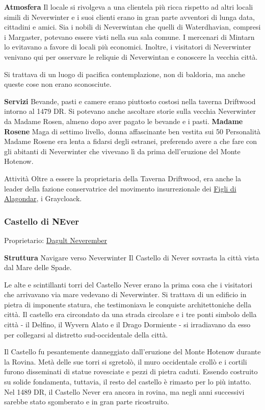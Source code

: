 \documentclass{article}
\begin{document}
\textbf{Atmosfera}
Il locale si rivolgeva a una clientela più ricca rispetto ad altri locali simili di Neverwinter e i suoi clienti erano in gran parte avventori di lunga data, cittadini e amici. Sia i nobili di Neverwintan che quelli di Waterdhavian, compresi i Margaster, potevano essere visti nella sua sala comune. I mercenari di Mintarn lo evitavano a favore di locali più economici. Inoltre, i visitatori di Neverwinter venivano qui per osservare le reliquie di Neverwintan e conoscere la vecchia città.

Si trattava di un luogo di pacifica contemplazione, non di baldoria, ma anche queste cose non erano sconosciute.

\textbf{Servizi}
Bevande, pasti e camere erano piuttosto costosi nella taverna Driftwood intorno al 1479 DR. Si potevano anche ascoltare storie sulla vecchia Neverwinter da Madame Rosen, almeno dopo aver pagato le bevande e i pasti.\newline
\textbf{Madame Rosene} Maga di settimo livello, donna affascinante ben vestita sui 50
Personalità
Madame Rosene era lenta a fidarsi degli estranei, preferendo avere a che fare con gli abitanti di Neverwinter che vivevano lì da prima dell'eruzione del Monte Hotenow.

Attività
Oltre a essere la proprietaria della Taverna Driftwood, era anche la leader della fazione conservatrice del movimento insurrezionale dei \hyperlink{alagondar}{Figli di Alagondar}, i Graycloack.

              \subsubsection{Castello di NEver}
Proprietario: \href{https://forgottenrealms.fandom.com/wiki/Dagult_Neverember}{Dagult Neverember}

\textbf{Struttura}
Navigare verso Neverwinter
Il Castello di Never sovrasta la città vista dal Mare delle Spade.

Le alte e scintillanti torri del Castello Never erano la prima cosa che i visitatori che arrivavano via mare vedevano di Neverwinter. Si trattava di un edificio in pietra di imponente statura, che testimoniava le conquiste architettoniche della città. Il castello era circondato da una strada circolare e i tre ponti simbolo della città - il Delfino, il Wyvern Alato e il Drago Dormiente - si irradiavano da esso per collegarsi al distretto sud-occidentale della città.

Il Castello fu pesantemente danneggiato dall'eruzione del Monte Hotenow durante la Rovina. Metà delle sue torri si sgretolò, il muro occidentale crollò e i cortili furono disseminati di statue rovesciate e pezzi di pietra caduti. Essendo costruito su solide fondamenta, tuttavia, il resto del castello è rimasto per lo più intatto. Nel 1489 DR, il Castello Never era ancora in rovina, ma negli anni successivi sarebbe stato sgomberato e in gran parte ricostruito.
\end{document}
